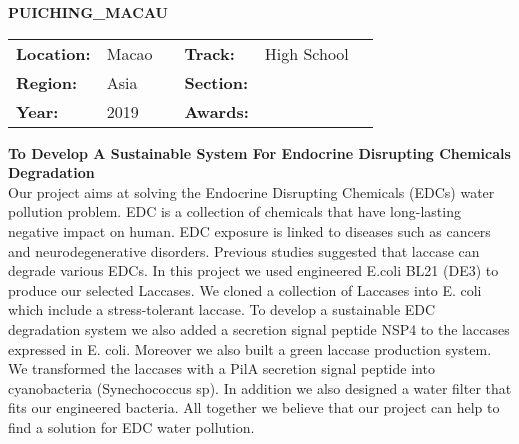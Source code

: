 \textbf{\uppercase{PuiChing\_Macau}} \FloatBarrier \begin{table}[h] \begin{tabular}{lp{2.5cm}llll} \textbf{Location:} & Macao & \multicolumn{1}{|l}{} & \textbf{Track:}   & High School \\ \textbf{Region:}   & Asia   & \multicolumn{1}{|l}{} & \textbf{Section:} &  \\ \textbf{Year:}     & 2019   & \multicolumn{1}{|l}{} & \textbf{Awards:}  & \end{tabular} \end{table} \FloatBarrier \noindent\textbf{To Develop A Sustainable System For Endocrine Disrupting Chemicals Degradation} \vspace{.2cm}\\ 
Our project aims at solving the Endocrine Disrupting Chemicals (EDCs) water pollution problem. EDC is a collection of chemicals that have long-lasting negative impact on human. EDC exposure is linked to diseases such as cancers and neurodegenerative disorders. Previous studies suggested that laccase can degrade various EDCs. In this project we used engineered E.coli BL21 (DE3) to produce our selected Laccases. We cloned a collection of Laccases into E. coli which include a stress-tolerant laccase. To develop a sustainable EDC degradation system we also added a secretion signal peptide NSP4 to the laccases expressed in E. coli. Moreover we also built a green laccase production system. We transformed the laccases with a PilA secretion signal peptide into cyanobacteria (Synechococcus sp). In addition we also designed a water filter that fits our engineered bacteria. All together we believe that our project can help to find a solution for EDC water pollution.
\vspace{2cm}

